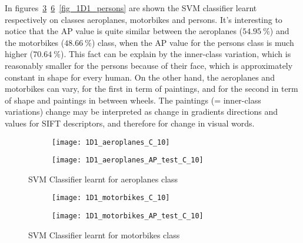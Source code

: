 \documentclass{article}
\begin{document}
In figures~\ref{fig_1D1_aeroplanes}~\ref{fig_1D1_motorbikes}~\ref{fig_1D1_persons} are shown the SVM classifier learnt respectively on classes aeroplanes, motorbikes and persons. It's interesting to notice that the AP value is quite similar between the aeroplanes (\(54.95~\%\)) and the motorbikes (\(48.66~\%\)) class, when the AP value for the persons class is much higher (\(70.64~\%\)). This fact can be explain by the inner-class variation, which is reasonably smaller for the persons because of their face, which is approximately constant in shape for every human. On the other hand, the aeroplanes and motorbikes can vary, for the first in term of paintings, and for the second in term of shape and paintings in between wheels. The paintings (= inner-class variations) change may be interpreted as change in gradients directions and values for SIFT descriptors, and therefore for change in visual words.

\begin{figure}[ht!]
	\centering
	\begin{subfigure}[b]{\textwidth}
		\centering
		\texttt{[image: 1D1\_aeroplanes\_C\_10]}
		\label{fig_1D1_aeroplanes_a}
	\end{subfigure}
	\begin{subfigure}[b]{\textwidth}
		\centering
		\texttt{[image: 1D1\_aeroplanes\_AP\_test\_C\_10]}
		\label{fig_1D1_aeroplanes_b}
	\end{subfigure}
	\caption{SVM Classifier learnt for aeroplanes class}
	\label{fig_1D1_aeroplanes}
\end{figure}

\begin{figure}[ht!]
	\centering
	\begin{subfigure}[b]{\textwidth}
		\centering
		\texttt{[image: 1D1\_motorbikes\_C\_10]}
		\label{fig_1D1_motorbikes_a}
	\end{subfigure}
	\begin{subfigure}[b]{\textwidth}
		\centering
		\texttt{[image: 1D1\_motorbikes\_AP\_test\_C\_10]}
		\label{fig_1D1_motorbikes_b}
	\end{subfigure}
	\caption{SVM Classifier learnt for motorbikes class}
	\label{fig_1D1_motorbikes}
\end{figure}
\end{document}
